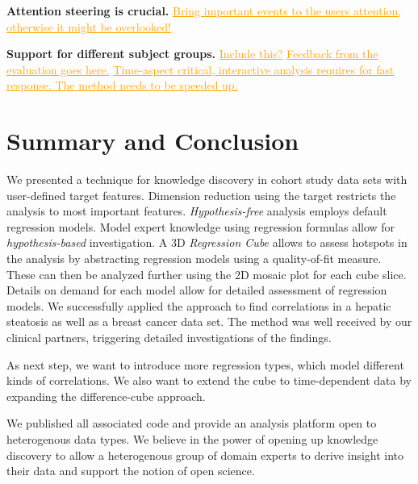 \documentclass[journal]{style/vgtc} 			          %
\newcommand{\com}[1]{\textcolor{orange}{\uline{#1}}}
\begin{document}
\textbf{Attention steering is crucial.}
\com{Bring important events to the users attention, otherwise it might be overlooked!}

\textbf{Support for different subject groups.}
\com{Include this?}
\com{Feedback from the evaluation goes here.}
\com{Time-aspect critical, interactive analysis requires for fast response. The method needs to be speeded up.}

\section{Summary and Conclusion}
We presented a technique for knowledge discovery in cohort study data sets with user-defined target features.
Dimension reduction using the target restricts the analysis to most important features.
\emph{Hypothesis-free} analysis employs default regression models.
Model expert knowledge using regression formulas allow for \emph{hypothesis-based} investigation.
A 3D \emph{Regression Cube} allows to assess hotspots in the analysis by abstracting regression models using a quality-of-fit measure.
These can then be analyzed further using the 2D mosaic plot for each cube slice.
Details on demand for each model allow for detailed assessment of regression models.
We successfully applied the approach to find correlations in a hepatic steatosis as well as a breast cancer data set.
The method was well received by our clinical partners, triggering detailed investigations of the findings.

As next step, we want to introduce more regression types, which model different kinds of correlations.
We also want to extend the cube to time-dependent data by expanding the difference-cube approach.

We published all associated code and provide an analysis platform open to heterogenous data types.
We believe in the power of opening up knowledge discovery to allow a heterogenous group of domain experts to derive insight into their data and support the notion of open science.
\end{document}
